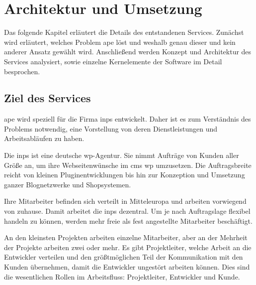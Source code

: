 

\section{Architektur und Umsetzung} %
\label{sec:architektur_und_umsetzung}

Das folgende Kapitel erläutert die Details des entstandenen Services. Zunächst wird erläutert, welches Problem \gls{ape} löst und weshalb genau dieser und kein anderer Ansatz gewählt wird. Anschließend werden Konzept und Architektur des Services analysiert, sowie einzelne Kernelemente der Software im Detail besprochen.

\subsection{Ziel des Services} %
\label{sub:ziel_des_services}

\gls{ape} wird speziell für die Firma \gls{inps} entwickelt. Daher ist es zum Verständnis des Problems notwendig, eine Vorstellung von deren Dienstleistungen und Arbeitsabläufen zu haben.

Die \gls{inps} ist eine deutsche \gls{wp}-Agentur. Sie nimmt Aufträge von Kunden aller Größe an, um ihre Webseitenwünsche im \gls{cms} \gls{wp} umzusetzen. Die Auftragsbreite reicht von kleinen Pluginentwicklungen bis hin zur Konzeption und Umsetzung ganzer Blognetzwerke und Shopsystemen.

Ihre Mitarbeiter befinden sich verteilt in Mitteleuropa und arbeiten vorwiegend von zuhause. Damit arbeitet die \gls{inps} dezentral. Um je nach Auftragslage flexibel handeln zu können, werden mehr freie als fest angestellte Mitarbeiter beschäftigt.

An den kleinsten Projekten arbeiten einzelne Mitarbeiter, aber an der Mehrheit der Projekte arbeiten zwei oder mehr. Es gibt Projektleiter, welche Arbeit an die Entwickler verteilen und den größtmöglichen Teil der Kommunikation mit den Kunden übernehmen, damit die Entwickler ungestört arbeiten können. Dies sind die wesentlichen Rollen im Arbeitsfluss: Projektleiter, Entwickler und Kunde.

